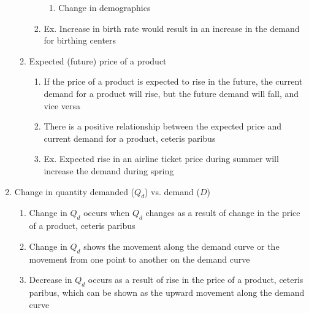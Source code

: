 \documentclass[12pt]{article}
\begin{document}
\begin{enumerate}
\begin{enumerate}
\begin{enumerate}
\begin{enumerate}
                  \item Change in demographics

                \end{enumerate}

              \item Ex. Increase in birth rate would result in an increase in the demand for birthing centers

            \end{enumerate}

          \item Expected (future) price of a product

            \begin{enumerate}

              \item If the price of a product is expected to rise in the future, the current demand for a product will rise, but the future demand will fall, and vice versa

              \item There is a positive relationship between the expected price and current demand for a product, ceteris paribus

              \item Ex. Expected rise in an airline ticket price during summer will increase the demand during spring

            \end{enumerate}

        \end{enumerate}

      \item Change in quantity demanded ($Q_d$) vs. demand ($D$)

        \begin{enumerate}
            
          \item Change in $Q_d$ occurs when $Q_d$ changes as a result of change in the price of a product, ceteris paribus

          \item Change in $Q_d$ shows the movement along the demand curve or the movement from one point to another on the demand curve

          \item Decrease in $Q_d$ occurs as a result of rise in the price of a product, ceteris paribus, which can be shown as the upward movement along the demand curve


\end{enumerate}
\end{enumerate}
\end{document}
